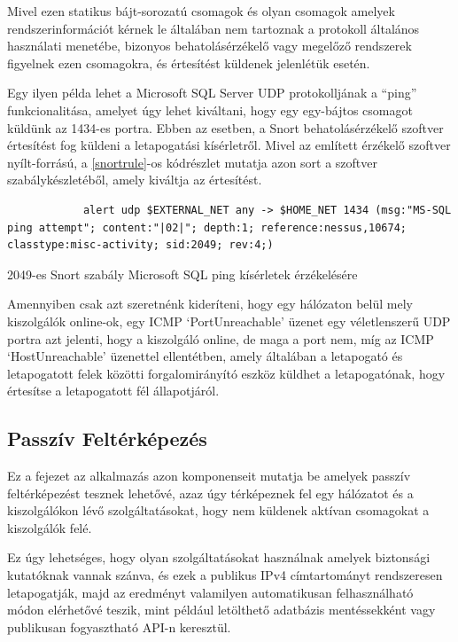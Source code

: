 \documentclass[a4paper,12pt]{article}
\begin{document}
	Mivel ezen statikus bájt-sorozatú csomagok és olyan csomagok amelyek rendszerinformációt kérnek le általában nem tartoznak a protokoll általános használati menetébe, bizonyos behatolásérzékelő vagy megelőző rendszerek figyelnek ezen csomagokra, és értesítést küldenek jelenlétük esetén.
	
	Egy ilyen példa lehet a Microsoft SQL Server UDP protokolljának a ``ping'' funkcionalitása, amelyet úgy lehet kiváltani, hogy egy egy-bájtos \texttt{} csomagot küldünk az 1434-es portra. Ebben az esetben, a Snort\cite{snort49} behatolásérzékelő szoftver értesítést fog küldeni a letapogatási kísérletről. Mivel az említett érzékelő szoftver nyílt-forrású, a \ref{snortrule}-os kódrészlet mutatja azon sort a szoftver szabálykészletéből, amely kiváltja az értesítést.
	
	\begin{listing}[H]
		\begin{verbatim}
			alert udp $EXTERNAL_NET any -> $HOME_NET 1434 (msg:"MS-SQL ping attempt"; content:"|02|"; depth:1; reference:nessus,10674; classtype:misc-activity; sid:2049; rev:4;)
		\end{verbatim}
		\caption{2049-es Snort szabály Microsoft SQL ping kísérletek érzékelésére\cite{snort49}}
		\label{snortrule}
	\end{listing}
	
	Amennyiben csak azt szeretnénk kideríteni, hogy egy hálózaton belül mely kiszolgálók online-ok, egy ICMP `PortUnreachable' üzenet egy véletlenszerű UDP portra azt jelenti, hogy a kiszolgáló online, de maga a port nem, míg az ICMP `HostUnreachable' üzenettel ellentétben, amely általában a letapogató és letapogatott felek közötti forgalomirányító eszköz küldhet a letapogatónak, hogy értesítse a letapogatott fél állapotjáról.

\subsection{Passzív Feltérképezés}

	Ez a fejezet az alkalmazás azon komponenseit mutatja be amelyek passzív feltérképezést tesznek lehetővé, azaz úgy térképeznek fel egy hálózatot és a kiszolgálókon lévő szolgáltatásokat, hogy nem küldenek aktívan csomagokat a kiszolgálók felé.
	
	Ez úgy lehetséges, hogy olyan szolgáltatásokat használnak amelyek biztonsági kutatóknak vannak szánva, és ezek a publikus IPv4 címtartományt rendszeresen letapogatják, majd az eredményt valamilyen automatikusan felhasználható módon elérhetővé teszik, mint például letölthető adatbázis mentéssekként vagy publikusan fogyasztható API-n keresztül.
\end{document}
